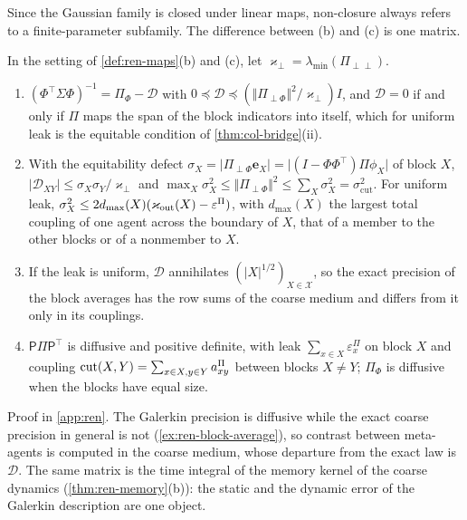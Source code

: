 Since the Gaussian family is closed under linear maps, non-closure always refers to a finite-parameter subfamily. The difference between (b) and (c) is one matrix.

\begin{lemma}\label{lem:ren-galerkin}
In the setting of \cref{def:ren-maps}(b) and (c), let $\varkappa_\perp=\lambda_{\min}(\Pi_{\perp\perp})$.
\begin{enumerate}
\item[(a)] $(\Phi^\top\Sigma\Phi)^{-1}=\Pi_\Phi-\mathcal D$ with $0\preceq\mathcal D\preceq(\Vert\Pi_{\perp\Phi}\Vert^2/\varkappa_\perp)I$, and $\mathcal D=0$ if and only if $\Pi$ maps the span of the block indicators into itself, which for uniform leak is the equitable condition of \cref{thm:col-bridge}(ii).
\item[(b)] With the equitability defect $\sigma_X=\lvert\Pi_{\perp\Phi}\mathbf e_X\rvert=\lvert(I-\Phi\Phi^\top)\Pi\phi_X\rvert$ of block $X$, $\lvert\mathcal D_{XY}\rvert\le\sigma_X\sigma_Y/\varkappa_\perp$ and $\max_X\sigma_X^2\le\Vert\Pi_{\perp\Phi}\Vert^2\le\sum_X\sigma_X^2=\sigma^2_{\mathrm{cut}}$. For uniform leak, $\sigma_X^2\le2d_{\max}(X)(\varkappa_{\mathrm{out}}(X)-\varepsilon^\Pi)$, with $d_{\max}(X)$ the largest total coupling of one agent across the boundary of $X$, that of a member to the other blocks or of a nonmember to $X$.
\item[(c)] If the leak is uniform, $\mathcal D$ annihilates $(\lvert X\rvert^{1/2})_{X\in\mathcal X}$, so the exact precision of the block averages has the row sums of the coarse medium and differs from it only in its couplings.
\item[(d)] $\mathsf P\Pi\mathsf P^\top$ is diffusive and positive definite, with leak $\sum_{x\in X}\varepsilon^\Pi_x$ on block $X$ and coupling $\operatorname{cut}(X,Y)=\sum_{x\in X,y\in Y}a^\Pi_{xy}$ between blocks $X\neq Y$; $\Pi_\Phi$ is diffusive when the blocks have equal size.
\end{enumerate}
\end{lemma}
Proof in \cref{app:ren}. The Galerkin precision is diffusive while the exact coarse precision in general is not (\cref{ex:ren-block-average}), so contrast between meta-agents is computed in the coarse medium, whose departure from the exact law is $\mathcal D$. The same matrix is the time integral of the memory kernel of the coarse dynamics (\cref{thm:ren-memory}(b)): the static and the dynamic error of the Galerkin description are one object.

